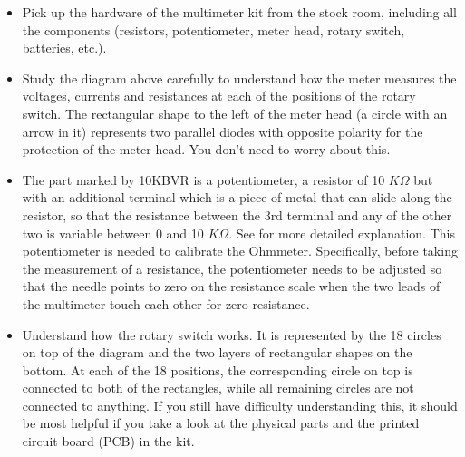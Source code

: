 \begin{itemize}
  \item Pick up the hardware of the multimeter kit from the stock room,
    including all the components (resistors, potentiometer, meter head, 
    rotary switch, batteries, etc.). 

  \item Study the diagram above carefully to understand how the meter 
    measures the voltages, currents and resistances at each of the positions 
    of the rotary switch. The rectangular shape to the left of the meter 
    head (a circle with an arrow in it) represents two parallel diodes 
    with opposite polarity for the protection of the meter head. You don't
    need to worry about this. 

  \item The part marked by 10KBVR is a potentiometer, a resistor of 10
    $K\Omega$ but with an additional terminal which is a piece of metal 
    that can slide along the resistor, so that the resistance between the 
    3rd terminal and any of the other two is variable between 0 and 10 
    $K\Omega$. See
    for more detailed explanation. This potentiometer is needed to calibrate
    the Ohmmeter. Specifically, before taking the measurement of a resistance,
    the potentiometer needs to be adjusted so that the needle points to 
    zero on the resistance scale when the two leads of the multimeter touch
    each other for zero resistance.
    
  \item Understand how the rotary switch works. It is represented by the 
    18 circles on top of the diagram and the two layers of rectangular shapes
    on the bottom. At each of the 18 positions, the corresponding circle on 
    top is connected to both of the rectangles, while all remaining circles 
    are not connected to anything. If you still have difficulty understanding 
    this, it should be most helpful if you take a look at the physical parts 
    and the printed circuit board (PCB) in the kit.



\end{itemize}
